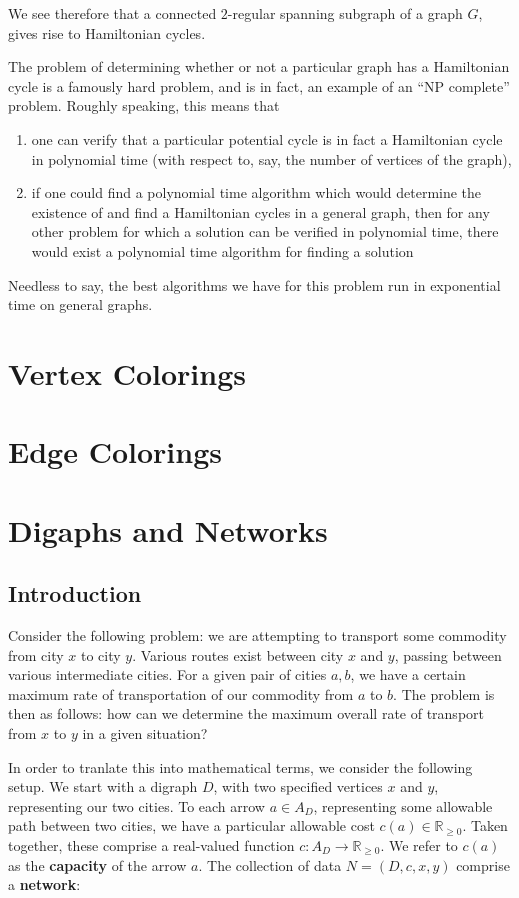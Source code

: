 \documentclass[12pt]{report}
\theoremstyle{plain}
\newcommand{\Xb}[1]{\textbf{#1}\index{#1}}
\begin{document}
We see therefore that a connected $2$-regular spanning subgraph of a graph $G$,
gives rise to Hamiltonian cycles. 

The problem of determining whether or not a particular graph has a
Hamiltonian cycle is a famously hard problem, and is in fact, an example of
an ``NP complete'' problem. Roughly speaking, this means that 
\begin{enumerate}
\item
one can verify that a particular potential cycle is in fact a Hamiltonian
cycle in polynomial time (with respect to, say, the number of vertices of
the graph), 
\item 
if one could find a polynomial time algorithm which would determine the
existence of and find a Hamiltonian
cycles in a general graph, then for any other problem for which a solution
can be verified in polynomial time, there would exist a polynomial time
algorithm for finding a solution
\end{enumerate}
Needless to say, the best algorithms we have for this problem run in
exponential time on general graphs. 

\chapter{Vertex Colorings}

\chapter{Edge Colorings}

\chapter{Digaphs and Networks}

\section{Introduction}

Consider the following problem: we are attempting to transport some
commodity from city $x$ to city $y$. Various routes exist between city $x$
and $y$, passing between various intermediate cities. For a given pair of
cities $a, b$, we have a certain maximum rate of transportation of our
commodity from $a$ to $b$. The problem is then as follows: how can we
determine the maximum overall rate of transport from $x$ to $y$ in a given
situation?

In order to tranlate this into mathematical terms, we consider the
following setup. We start with a digraph $D$, with two specified vertices
$x$ and $y$, representing our two cities. To each arrow $a \in A_D$,
representing some allowable path between two cities, we have a particular
allowable cost $c(a) \in \mathbb R_{\geq 0}$. Taken together, these
comprise a real-valued function $c: A_D \to \mathbb R_{\geq 0}$. We refer
to $c(a)$ as the \textbf{capacity} of the arrow
$a$. The collection of data $N = (D, c, x, y)$ comprise a \Xb{network}:
\end{document}
